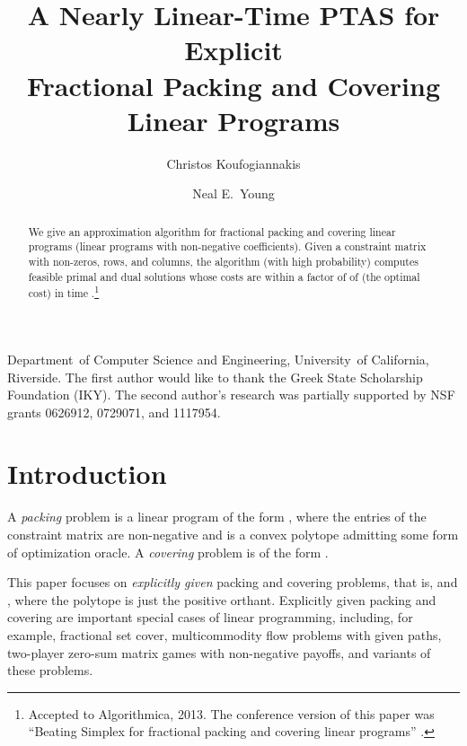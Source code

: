 \documentclass[11pt]{svjour3} \usepackage{fullpage}
\begin{document}
\journalname{}
\def\makeheadbox{}

\title{A Nearly Linear-Time PTAS for Explicit \\Fractional Packing and Covering Linear Programs}
\author
{
	Christos Koufogiannakis \and Neal E.\ Young
}
\institute
        {Department~of Computer Science and Engineering, University~of California, Riverside.
          The first author would like to thank the Greek State Scholarship Foundation (IKY).
          The second author's research was partially supported by
          NSF grants 0626912, 0729071, and 1117954.
}

\date{}








\maketitle



\begin{abstract}
We give an approximation algorithm for fractional
packing and covering linear programs (linear programs with non-negative coefficients).
Given a constraint matrix with  non-zeros,  rows, and  columns,
the algorithm (with high probability) computes feasible primal and dual solutions
whose costs are within a factor of  of   (the optimal cost)
in time .\footnote
{Accepted to Algorithmica, 2013.  The conference version of this paper was ``Beating Simplex for fractional packing and covering linear programs'' \cite{Koufogiannakis2007Beating}.
}
\end{abstract}

\section{Introduction}\label{sec:intro}

A {\em packing} problem is a linear program of the form , where the entries of the constraint matrix  are non-negative and  is a convex polytope admitting some form of optimization oracle.  
A {\em covering} problem is of the form .  

This paper focuses on {\em explicitly given} packing and covering problems, that is,  and , where the polytope  is just the positive orthant.  
Explicitly given packing and covering are important special cases of linear programming,
including, for example, fractional set cover, multicommodity flow problems with given paths, two-player zero-sum matrix games with non-negative payoffs, and variants of these problems.
\end{document}
